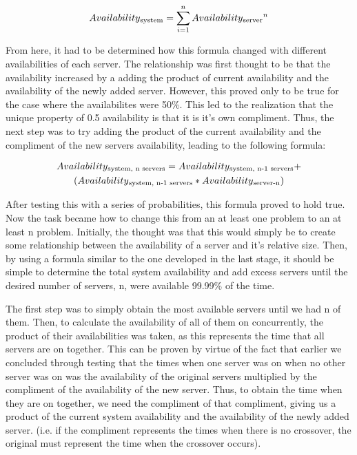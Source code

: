 \documentclass[thesis,proposal]{umassthesis}  %
\begin{document}
\begin{equation}\label{form21}
Availability\textsubscript{system} = \sum\limits_{i=1}^{n} Availability\textsubscript{server}^n
\end{equation}

From here, it had to be determined how this formula changed with different availabilities of each server. The relationship was first thought to be that the availability increased by a adding the product of current availability and the availability of the newly added server. However, this proved only to be true for the case where the availabilites were 50\%. This led to the realization that the unique property of 0.5 availability is that it is it's own compliment. Thus, the next step was to try adding the product of the current availability and the compliment of the new servers availability, leading to the following formula:

\begin{multline}\label{form22}
Availability\textsubscript{system, n servers} = Availability\textsubscript{system, n-1 servers} +\\(Availability\textsubscript{system, n-1 servers} * Availability\textsubscript{server-n})
\end{multline}

After testing this with a series of probabilities, this formula proved to hold true. Now the task became how to change this from an at least one problem to an at least n problem. Initially, the thought was that this would simply be to create some relationship between the availability of a server and it's relative size. Then, by using a formula similar to the one developed in the last stage, it should be simple to determine the total system availability and add excess servers until the desired number of servers, n, were available 99.99\% of the time.\par

The first step was to simply obtain the most available servers until we had n of them. Then, to calculate the availability of all of them on concurrently, the product of their availabilities was taken, as this represents the time that all servers are on together. This can be proven by virtue of the fact that earlier we concluded through testing that the times when one server was on when no other server was on was the availability of the original servers multiplied by the compliment of the availability of the new server. Thus, to obtain the time when they are on together, we need the compliment of that compliment, giving us a product of the current system availability and the availability of the newly added server. (i.e. if the compliment represents the times when there is no crossover, the original must represent the time when the crossover occurs).\par
\end{document}
